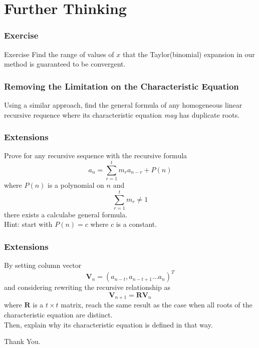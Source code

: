 \documentclass{beamer}
\theoremstyle{definition}
\theoremstyle{remark}
\begin{document}
\section{Further Thinking}
\begin{frame}
  \frametitle{Exercise}
  \begin{block}{Exercise}
    Find the range of values of $x$ that the
    Taylor(binomial) expansion in our method
    is guaranteed to be convergent.
  \end{block}
\end{frame}
\begin{frame}
  \frametitle{Removing the Limitation on the Characteristic Equation}
  \begin{problem}[1*]
    Using a similar approach, find the general formula 
    of any homogeneous linear recursive requence where 
    its characteristic equation \emph{may} has 
    duplicate roots. 
  \end{problem}
\end{frame}
\begin{frame}
  \frametitle{Extensions}
\begin{problem}[2**]
  Prove for any recursive
  sequence with the recursive formula \[
    a_n = \sum_{r=1}^t m_r a_{n-r} + P(n)
  \] where $P(n)$ is a polynomial on $n$ and \[
    \sum_{r=1}^t m_r \neq 1
  \]
  there exists a calculabe general formula. \\
  Hint: start with $P(n) = c$ where $c$ is a constant.
\end{problem}
\end{frame}
\begin{frame}
  \frametitle{Extensions}
  \begin{problem}[3**]
     By setting column vector \[
       \textbf{V}_n = (a_{n-t}, a_{n-t+1}\dots a_n)^T
     \]
     and considering rewriting the recursive relationship
     as \[
       \textbf{V}_{n+1} = \textbf{R}\textbf{V}_n
     \] where $\textbf{R}$ is a $t \times t$
     matrix, reach the same result as the case 
     when all roots of the characteristic equation 
     are distinct.\\ Then, explain why its characteristic
     equation is defined in that way.
  \end{problem}
\end{frame}
\begin{frame}
  \huge{Thank You.}
\end{frame}
\end{document}
